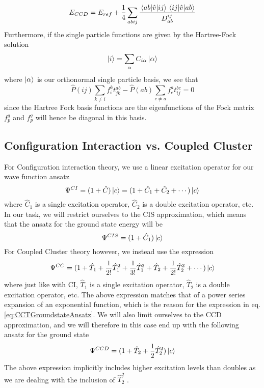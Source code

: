 \documentclass[a4paper,12pt]{article}
\newcommand{\brak}[2]{\mel{#1}{\hat{v}}{#2}}
\begin{document}
\begin{equation}
    \label{eq:MBPTEnergy}
    E_{CCD} = E_{ref} + \frac{1}{4} \sum_{abij} \frac{\brak{ab}{ij} \brak{ij}{ab}}{D_{ab}^{ij}}
\end{equation}
Furthermore, if the single particle functions are given by the Hartree-Fock solution
$$\ket{i} = \sum_\alpha C_{i\alpha} \ket{\alpha} $$
where $\ket{\alpha}$ is our orthonormal single particle basis, we see that
\begin{equation*}
    \hat{P}(ij)\sum_{k \neq i} f_i^k t_{jk}^{ab} - \hat{P}(ab)\sum_{c \neq a} f_c^a t_{ij}^{bc} = 0
\end{equation*}
since the Hartree Fock basis functions are the eigenfunctions of the Fock matrix $f_p^q$ and $f_p^q$ will hence be diagonal in this basis.


\subsection{Configuration Interaction vs. Coupled Cluster}
\label{sec:CIVSCC}
For Configuration interaction theory, we use a linear excitation operator for our wave function ansatz
\begin{equation*}
    \Psi^{CI} = (1+ \hat{C})\ket{c} = (1 + \hat{C}_1 + \hat{C}_2 + \cdots)\ket{c}
\end{equation*}
where $\hat{C}_1$ is a single excitation operator, $\hat{C}_2$ is a double excitation operator, etc.
In our task, we will restrict ourselves to the CIS approximation, which means that the ansatz for the ground state energy will be
\begin{equation*}
    \Psi^{CIS} = (1 + \hat{C}_1)\ket{c}
\end{equation*}
For Coupled Cluster theory however, we instead use the expression
\begin{equation*}
    \Psi^{CC} = (1 + \hat{T}_1 + \frac{1}{2!}\hat{T}_1^2 + \frac{1}{3!}\hat{T}_1^3 + \hat{T}_2 + \frac{1}{2!}\hat{T}_2^2 + \cdots)\ket{c}
\end{equation*}
where just like with CI, $\hat{T}_1$ is a single excitation operator, $\hat{T}_2$ is a double excitation operator, etc. The above expression matches that of a power series expansion of an exponential function, which is the reason for the expression in eq. \ref{eq:CCTGroundstateAnsatz}. 
We will also limit ourselves to the CCD approximation, and we will therefore in this case end up with the following ansatz for the ground state
\begin{equation*}
    \Psi^{CCD} = (1 + \hat{T}_2 + \frac{1}{2}\hat{T}_2^2)\ket{c}
\end{equation*}
The above expression implicitly includes higher excitation levels than doubles as we are dealing with the inclusion of $\hat{T}_2^2$ \cite{crawford}.
\end{document}
